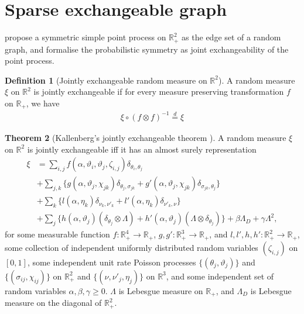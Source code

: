 \documentclass{article}
\theoremstyle{definition}
\newtheorem{definition}{Definition}
\newtheorem{theorem}[definition]{Theorem}
\begin{document}
\section{Sparse exchangeable graph}
\citet{Caron2015} propose a symmetric simple point process on $\mathbb{R}^2_+$ as the edge set of a random graph, and \citet{Veitch2015} formalise the probabilistic symmetry as joint exchangeability of the point process.
\begin{definition}[Jointly exchangeable random measure on $\mathbb{R}^2$] A random measure $\xi$ on $\mathbb{R}^2$ is jointly exchangeable if for every measure preserving transformation $f$ on $\mathbb{R}_+$, we have
\begin{align}
\xi \circ (f \otimes f)^{-1} \stackrel{d}{=} \xi
\end{align}
\end{definition}
\begin{theorem}[\label{thm:kallenjoint}Kallenberg's jointly exchangeable theorem \citep{Kallenberg1990,kallenberg2005probabilistic}] A random measure $\xi$ on $\mathbb{R}^2$ is jointly exchangeable iff it has an almost surely representation
\begin{align}
\xi &= \sum_{i,j} f(\alpha, \vartheta_i, \vartheta_j, \zeta_{i,j})\delta_{\theta_i, \theta_j} \label{eqn:kallenjoint}\\
&+ \sum_{j,k}\{g(\alpha, \vartheta_j, \chi_{jk})\delta_{\theta_j,\sigma_{jk}} + g'(\alpha, \vartheta_j, \chi_{jk})\delta_{\sigma_{jk},\theta_j}\}\\
&+ \sum_{k}\{l(\alpha, \eta_k)\delta_{\nu_k,\nu'_k} + l'(\alpha, \eta_k)\delta_{\nu'_k, \nu}\}\\
&+\sum_j\{h(\alpha, \vartheta_j)(\delta_{\theta_j} \otimes \Lambda) + h'(\alpha, \vartheta_j)(\Lambda \otimes \delta_{\theta_j})\} + \beta\Lambda_D + \gamma \Lambda^2,
\end{align}
for some measurable function $f:\mathbb{R}_+^4 \rightarrow \mathbb{R}_+$, $g,g':\mathbb{R}_+^3 \rightarrow \mathbb{R}_+$, and $l, l', h, h': \mathbb{R}_+^2\rightarrow\mathbb{R}_+$, some collection of independent uniformly distributed random variables $(\zeta_{i,j})$ on $[0,1]$, some independent unit rate Poisson processes $\{(\theta_j, \vartheta_j)\}$ and $\{(\sigma_{ij}, \chi_{ij})\}$ on $\mathbb{R}_+^2$ and $\{(\nu, \nu'_j, \eta_j)\}$ on $\mathbb{R}^3$, and some independent set of random variables $\alpha, \beta, \gamma \geq 0$. $\Lambda$ is Lebesgue measure on $\mathbb{R}_+$, and $\Lambda_D$ is Lebesgue measure on the diagonal of $\mathbb{R}_+^2$.
\end{theorem}
\end{document}
